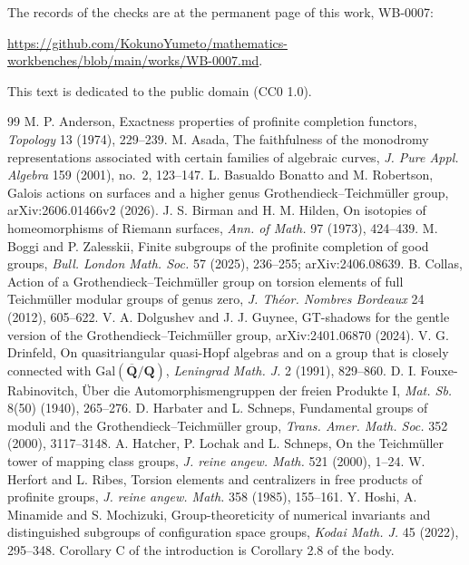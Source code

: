 \documentclass[11pt,a4paper]{article}
\theoremstyle{plain}
\theoremstyle{definition}
\theoremstyle{remark}
\newcommand{\recordurl}{https://github.com/KokunoYumeto/mathematics-workbenches/blob/main/works/WB-0007.md}
\begin{document}
The records of the checks are at the permanent page of this work, WB-0007:

{\raggedright\smallskip\noindent\url{\recordurl}.\par}

\smallskip
This text is dedicated to the public domain (CC0 1.0).

\begin{thebibliography}{99}\small
{} M. P. Anderson, Exactness properties of profinite completion functors, \emph{Topology} 13 (1974),
229--239.
 M. Asada, The faithfulness of the monodromy representations associated with certain families of
algebraic curves, \emph{J. Pure Appl. Algebra} 159 (2001), no.~2, 123--147.
 L. Basualdo Bonatto and M. Robertson, Galois actions on surfaces and a higher genus
Grothendieck--Teichm\"uller group, arXiv:2606.01466v2 (2026).
 J. S. Birman and H. M. Hilden, On isotopies of homeomorphisms of Riemann surfaces, \emph{Ann. of Math.}
97 (1973), 424--439.
 M. Boggi and P. Zalesskii, Finite subgroups of the profinite completion of good groups, \emph{Bull.
London Math. Soc.} 57 (2025), 236--255; arXiv:2406.08639.
 B. Collas, Action of a Grothendieck--Teichm\"uller group on torsion elements of full Teichm\"uller
modular groups of genus zero, \emph{J. Th\'eor. Nombres Bordeaux} 24 (2012), 605--622.
 V. A. Dolgushev and J. J. Guynee, GT-shadows for the gentle version of the Grothendieck--Teichm\"uller
group, arXiv:2401.06870 (2024).
 V. G. Drinfeld, On quasitriangular quasi-Hopf algebras and on a group that is closely connected with
$\mathrm{Gal}(\overline{\mathbf Q}/\mathbf Q)$, \emph{Leningrad Math. J.} 2 (1991), 829--860.
 D. I. Fouxe-Rabinovitch, \"Uber die Automorphismengruppen der freien Produkte I, \emph{Mat. Sb.} 8(50)
(1940), 265--276.
 D. Harbater and L. Schneps, Fundamental groups of moduli and the Grothendieck--Teichm\"uller group,
\emph{Trans. Amer. Math. Soc.} 352 (2000), 3117--3148.
 A. Hatcher, P. Lochak and L. Schneps, On the Teichm\"uller tower of mapping class groups, \emph{J.
reine angew. Math.} 521 (2000), 1--24.
 W. Herfort and L. Ribes, Torsion elements and centralizers in free products of profinite groups,
\emph{J. reine angew. Math.} 358 (1985), 155--161.
 Y. Hoshi, A. Minamide and S. Mochizuki, Group-theoreticity of numerical invariants and distinguished
subgroups of configuration space groups, \emph{Kodai Math. J.} 45 (2022), 295--348. Corollary C of the
introduction is Corollary 2.8 of the body.

\end{thebibliography}
\end{document}
